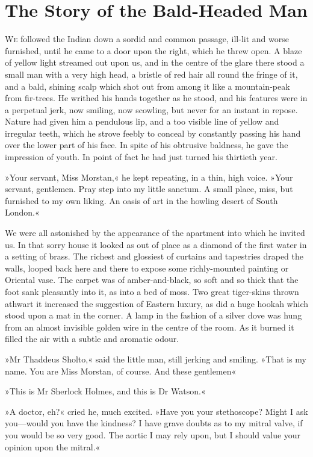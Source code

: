 \chapter{The Story of the Bald-Headed Man}

\lettrine[lines=4]{W}{e} followed the Indian down a sordid and common passage, ill-lit and worse furnished, until he came to a door upon the right, which he threw open. A blaze of yellow light streamed out upon us, and in the centre of the glare there stood a small man with a very high head, a bristle of red hair all round the fringe of it, and a bald, shining scalp which shot out from among it like a mountain-peak from fir-trees. He writhed his hands together as he stood, and his features were in a perpetual jerk, now smiling, now scowling, but never for an instant in repose. Nature had given him a pendulous lip, and a too visible line of yellow and irregular teeth, which he strove feebly to conceal by constantly passing his hand over the lower part of his face. In spite of his obtrusive baldness, he gave the impression of youth. In point of fact he had just turned his thirtieth year.

»Your servant, Miss Morstan,« he kept repeating, in a thin, high voice. »Your servant, gentlemen. Pray step into my little sanctum. A small place, miss, but furnished to my own liking. An oasis of art in the howling desert of South London.«

We were all astonished by the appearance of the apartment into which he invited us. In that sorry house it looked as out of place as a diamond of the first water in a setting of brass. The richest and glossiest of curtains and tapestries draped the walls, looped back here and there to expose some richly-mounted painting or Oriental vase. The carpet was of amber-and-black, so soft and so thick that the foot sank pleasantly into it, as into a bed of moss. Two great tiger-skins thrown athwart it increased the suggestion of Eastern luxury, as did a huge hookah which stood upon a mat in the corner. A lamp in the fashion of a silver dove was hung from an almost invisible golden wire in the centre of the room. As it burned it filled the air with a subtle and aromatic odour.

»Mr Thaddeus Sholto,« said the little man, still jerking and smiling. »That is my name. You are Miss Morstan, of course. And these gentlemen\longdash«

»This is Mr Sherlock Holmes, and this is Dr Watson.«

»A doctor, eh?« cried he, much excited. »Have you your stethoscope? Might I ask you—would you have the kindness? I have grave doubts as to my mitral valve, if you would be so very good. The aortic I may rely upon, but I should value your opinion upon the mitral.«

